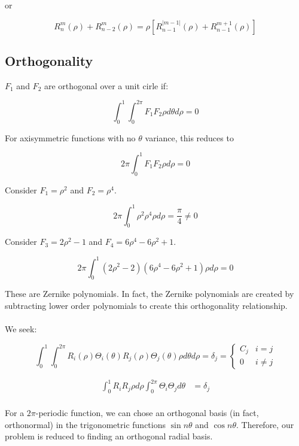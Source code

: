 \documentclass{tufte-handout}
\begin{document}
or


\begin{equation}
R_n^m(\rho)+R_{n-2}^m(\rho)=\rho\left[R_{n-1}^{\left|m-1\right|}(\rho)+R_{n-1}^
{m+1}(\rho)\right]
\end{equation}

\subsection{Orthogonality}
 $F_1$ and $F_2$ are orthogonal over a unit cirle if:

$$\int_0^1\int_0^{2\pi} F_1F_2\rho d\theta d\rho = 0$$

For axisymmetric functions with no $\theta$ variance, this reduces to

$$2\pi \int_0^1 F_1F_2 \rho d\rho = 0$$

Consider $F_1=\rho^2$ and $F_2=\rho^4$.

$$2\pi\int_0^1 \rho^2 \rho^4\rho  d\rho = \frac{\pi}{4}\neq 0$$

Consider $F_3=2\rho^2-1$ and $F_4=6\rho^4-6\rho^2+1$.

$$2\pi\int_0^1 (2\rho^2-2)(6 \rho^4-6\rho^2+1)\rho  d\rho = 0$$

These are Zernike polynomials.  In fact, the Zernike polynomials are created by
subtracting lower order polynomials to create this orthogonality relationship.

\paragraph{}We seek:

$$\int_0^1\int_0^{2\pi} R_i(\rho)\Theta_i(\theta)R_j(\rho)\Theta_j(\theta)\rho
d\theta d\rho = \delta_j=\left\{
     \begin{array}{lr}
        C_j&  i=j\\
       0 & i\neq j
     \end{array}
   \right.$$

\begin{align*}
\int_0^1R_iR_j\rho d\rho\int_0^{2\pi} \Theta_i\Theta_jd\theta  &= \delta_j\\
\end{align*}

For a $2\pi$-periodic function, we can chose an orthogonal basis (in fact,
orthonormal) in the trigonometric functions $\sin n\theta$ and $\cos n\theta$.
Therefore, our problem is reduced to finding an orthogonal radial basis.
\end{document}
